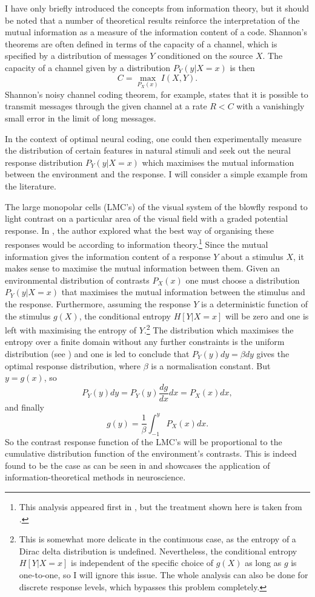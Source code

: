 I have only briefly introduced the concepts from information theory, but it should be noted that a number of theoretical results reinforce the interpretation of the mutual
information as a measure of the information content of a code. Shannon's theorems are often defined in terms of the capacity of a channel, which is specified by a distribution of
messages $Y$ conditioned on the source $X$. The capacity of a channel given by a distribution $P_Y(y|X=x)$ is then
\[
C = \max_{P_X(x)} I(X,Y).
\]
Shannon's noisy channel coding theorem, for example, states that it is possible to transmit messages through the given channel at a rate $R < C$ with a vanishingly 
small error in the limit of long messages.\par
In the context of optimal neural coding, one could then experimentally measure the distribution of certain features in natural stimuli and seek out the neural response
distribution $P_Y(y|X=x)$ which maximises the mutual information between the environment and the response. 
I will consider a simple example from the literature.
\par

The large monopolar cells (LMC's) of the visual system of the blowfly respond to light contrast on a particular area of the visual field with a graded potential response.
In , the author explored what the best way of organising these responses would be according to information theory.\footnote{This analysis appeared 
first in , but the treatment shown here is taken from .} Since the mutual information gives the information content of a response $Y$ 
about a stimulus $X$, it makes sense to maximise the mutual information between them. Given an environmental distribution of contrasts
$P_X(x)$ one must choose a distribution $P_Y(y|X=x)$ that maximises the mutual information between the stimulus and the response. Furthermore, assuming the
response $Y$ is a deterministic function of the stimulus $g(X)$, the conditional entropy $H[Y|X=x]$ will be zero and one is left with maximising the entropy of 
$Y$.\footnote{This is somewhat more delicate in the continuous case, as the entropy of a Dirac delta distribution is undefined. Nevertheless, the conditional entropy
$H[Y|X=x]$ is independent of the specific choice of $g(X)$ as long as $g$ is one-to-one, so I will ignore this issue. The whole analysis can also be done for 
discrete response levels, which bypasses this problem completely.}
The distribution which maximises the entropy over a finite domain without any further constraints is the uniform distribution (see ) and one is led to
conclude that $P_Y(y) dy= \beta dy$ gives the optimal response distribution, where $\beta$ is a normalisation constant. But $y = g(x)$, so
\[
P_Y(y) dy = P_Y(y) \frac{dg}{dx} dx =  P_X(x)dx,
\]
and finally
\[
g(y) = \frac{1}{\beta} \int_{-1}^y P_X(x) dx.
\]
So the contrast response function of the LMC's will be proportional to the cumulative distribution function of the environment's contrasts. This is indeed found to be the
case as can be seen in  and showcases the application of information-theoretical methods in neuroscience.

